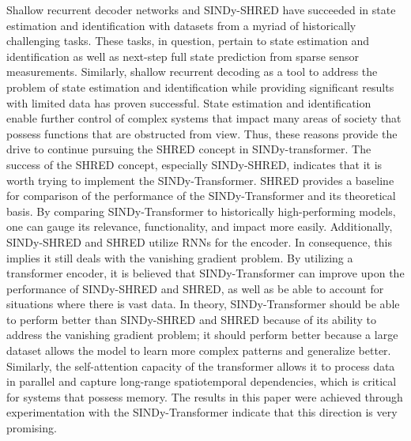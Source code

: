 \documentclass[11pt, a4paper]{article}
\begin{document}
Shallow recurrent decoder networks and SINDy-SHRED have succeeded in state estimation and identification with datasets from a myriad of historically challenging tasks. These tasks, in question, pertain to state estimation and identification as well as next-step full state prediction from sparse sensor measurements. Similarly, shallow recurrent decoding as a tool to address the problem of state estimation and identification while providing significant results with limited data has proven successful. State estimation and identification enable further control of complex systems that impact many areas of society that possess functions that are obstructed from view. Thus, these reasons provide the drive to continue pursuing the SHRED concept in SINDy-transformer. The success of the SHRED concept, especially SINDy-SHRED, indicates that it is worth trying to implement the SINDy-Transformer. SHRED provides a baseline for comparison of the performance of the SINDy-Transformer and its theoretical basis. By comparing SINDy-Transformer to historically high-performing models, one can gauge its relevance, functionality, and impact more easily. Additionally, SINDy-SHRED and SHRED utilize RNNs for the encoder. In consequence, this implies it still deals with the vanishing gradient problem. By utilizing a transformer encoder, it is believed that SINDy-Transformer can improve upon the performance of SINDy-SHRED and SHRED, as well as be able to account for situations where there is vast data. In theory, SINDy-Transformer should be able to perform better than SINDy-SHRED and SHRED because of its ability to address the vanishing gradient problem; it should perform better because a large dataset allows the model to learn more complex patterns and generalize better. Similarly, the self-attention capacity of the transformer allows it to process data in parallel and capture long-range spatiotemporal dependencies, which is critical for systems that possess memory. The results in this paper were achieved through experimentation with the SINDy-Transformer indicate that this direction is very promising.
\end{document}

